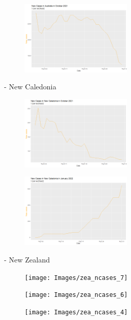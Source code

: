\documentclass[a4paper]{article}
\theoremstyle{definition}
\begin{document}
\begin{enumerate}[i)]
\begin{enumerate}[1)]
		\begin{figure} [!htp]
  		\centering
  		\includegraphics [width=0.47\textwidth] {Images/aus_ncases_2}
		\end{figure}
	- New Caledonia\\
		\begin{figure} [!htp]
  		\centering
  		\includegraphics [width=0.47\textwidth] {Images/cal_ncases_1}
		\end{figure}
		
		\begin{figure} [!htp]
  		\centering
  		\includegraphics [width=0.47\textwidth] {Images/cal_ncases_2}
		\end{figure}
	- New Zealand\\
		\begin{figure} [!htp]
  		\centering
  		\texttt{[image: Images/zea\_ncases\_7]}
		\end{figure}
		
		\begin{figure} [!htp]
  		\centering
  		\texttt{[image: Images/zea\_ncases\_6]}
		\end{figure}
		
		\begin{figure} [!htp]
  		\centering
  		\texttt{[image: Images/zea\_ncases\_4]}
		\end{figure}
		

\end{enumerate}
\end{enumerate}
\end{document}

